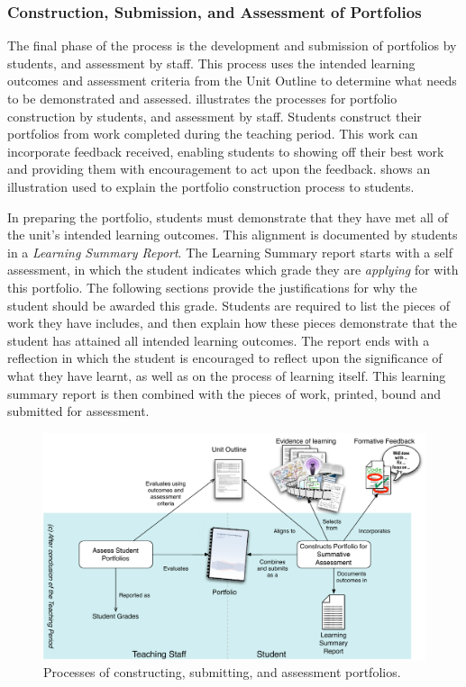 
\subsubsection{Construction, Submission, and Assessment of Portfolios} %
\label{ssub:construction_submission_and_assessment_of_portfolios}

The final phase of the process is the development and submission of portfolios by students, and assessment by staff. This process uses the intended learning outcomes and assessment criteria from the Unit Outline to determine what needs to be demonstrated and assessed.  illustrates the processes for portfolio construction by students, and assessment by staff. Students construct their portfolios from work completed during the teaching period. This work can incorporate feedback received, enabling students to showing off their best work and providing them with encouragement to act upon the feedback.  shows an illustration used to explain the portfolio construction process to students. 

In preparing the portfolio, students must demonstrate that they have met all of the unit's intended learning outcomes. This alignment is documented by students in a \emph{Learning Summary Report}. The Learning Summary report starts with a self assessment, in which the student indicates which grade they are \emph{applying} for with this portfolio. The following sections provide the justifications for why the student should be awarded this grade. Students are required to list the pieces of work they have includes, and then explain how these pieces demonstrate that the student has attained all intended learning outcomes. The report ends with a reflection in which the student is encouraged to reflect upon the significance of what they have learnt, as well as on the process of learning itself. This learning summary report is then combined with the pieces of work, printed, bound and submitted for assessment.

\begin{figure}[p]
	\centering
	\includegraphics[width=\textwidth]{PortfolioConstructionAssessment}
	\caption{Processes of constructing, submitting, and assessment portfolios.}
	\label{fig:portfolio_processes}
\end{figure}


